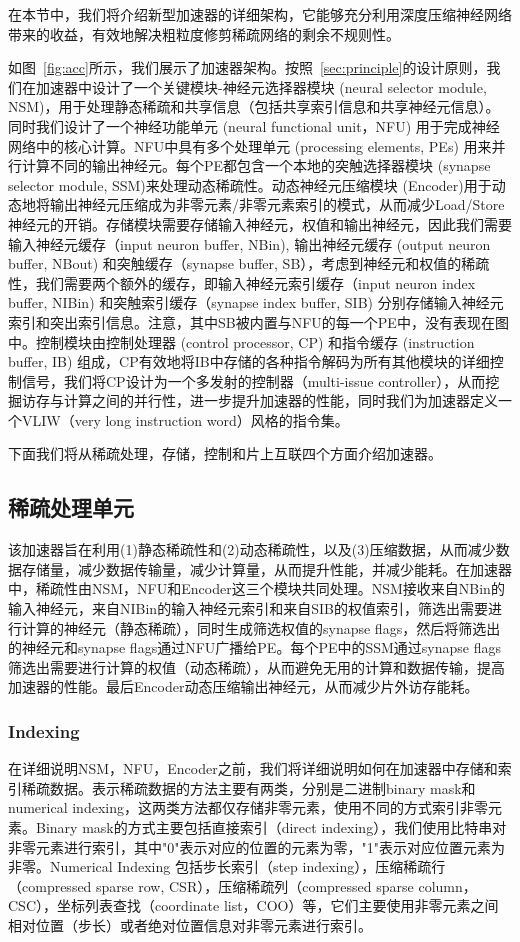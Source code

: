 在本节中，我们将介绍新型加速器的详细架构，它能够充分利用深度压缩神经网络带来的收益，有效地解决粗粒度修剪稀疏网络的剩余不规则性。

如图~\ref{fig:acc}所示，我们展示了加速器架构。按照~\ref{sec:principle}的设计原则，我们在加速器中设计了一个关键模块-神经元选择器模块 (neural selector module, NSM)，用于处理静态稀疏和共享信息（包括共享索引信息和共享神经元信息）。同时我们设计了一个神经功能单元 (neural functional unit，NFU) 用于完成神经网络中的核心计算。NFU中具有多个处理单元 (processing elements, PEs) 用来并行计算不同的输出神经元。每个PE都包含一个本地的突触选择器模块 (synapse selector module, SSM)来处理动态稀疏性。动态神经元压缩模块 (Encoder)用于动态地将输出神经元压缩成为非零元素/非零元素索引的模式，从而减少Load/Store神经元的开销。存储模块需要存储输入神经元，权值和输出神经元，因此我们需要输入神经元缓存（input neuron buffer, NBin), 输出神经元缓存 (output neuron buffer, NBout) 和突触缓存（synapse buffer, SB），考虑到神经元和权值的稀疏性，我们需要两个额外的缓存，即输入神经元索引缓存（input neuron index buffer, NIBin) 和突触索引缓存（synapse index buffer, SIB) 分别存储输入神经元索引和突出索引信息。注意，其中SB被内置与NFU的每一个PE中，没有表现在图中。控制模块由控制处理器 (control processor, CP) 和指令缓存 (instruction buffer, IB) 组成，CP有效地将IB中存储的各种指令解码为所有其他模块的详细控制信号，我们将CP设计为一个多发射的控制器（multi-issue controller），从而挖掘访存与计算之间的并行性，进一步提升加速器的性能，同时我们为加速器定义一个VLIW（very long instruction word）风格的指令集。

下面我们将从稀疏处理，存储，控制和片上互联四个方面介绍加速器。

\subsection{稀疏处理单元}
该加速器旨在利用(1)静态稀疏性和(2)动态稀疏性，以及(3)压缩数据，从而减少数据存储量，减少数据传输量，减少计算量，从而提升性能，并减少能耗。在加速器中，稀疏性由NSM，NFU和Encoder这三个模块共同处理。NSM接收来自NBin的输入神经元，来自NIBin的输入神经元索引和来自SIB的权值索引，筛选出需要进行计算的神经元（静态稀疏），同时生成筛选权值的synapse flags，然后将筛选出的神经元和synapse flags通过NFU广播给PE。每个PE中的SSM通过synapse flags筛选出需要进行计算的权值（动态稀疏），从而避免无用的计算和数据传输，提高加速器的性能。最后Encoder动态压缩输出神经元，从而减少片外访存能耗。

\subsubsection{Indexing}
在详细说明NSM，NFU，Encoder之前，我们将详细说明如何在加速器中存储和索引稀疏数据。表示稀疏数据的方法主要有两类，分别是二进制binary mask和numerical indexing，这两类方法都仅存储非零元素，使用不同的方式索引非零元素。Binary mask的方式主要包括直接索引（direct indexing），我们使用比特串对非零元素进行索引，其中"0"表示对应的位置的元素为零，"1"表示对应位置元素为非零。Numerical Indexing 包括步长索引（step indexing），压缩稀疏行（compressed sparse row, CSR），压缩稀疏列（compressed sparse column，CSC），坐标列表查找（coordinate list，COO）等，它们主要使用非零元素之间相对位置（步长）或者绝对位置信息对非零元素进行索引。

